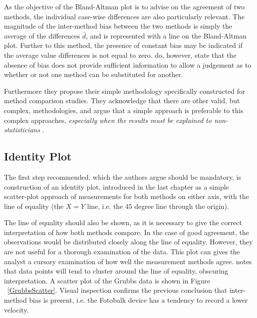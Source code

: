 \documentclass[12pt, a4paper]{report}
\theoremstyle{plain}
\theoremstyle{definition}
\theoremstyle{remark}
\begin{document}
	As the objective of the Bland-Altman plot is to advise on the agreement of two methods, the individual case-wise differences are also particularly relevant.	The magnitude of the inter-method bias between the two methods is simply the average of the differences $\bar{d}$, and is represented with a line on the Bland-Altman plot. Further to this method, the presence of constant bias may be
	indicated if the average value differences is not equal to zero. \citet{BA86} do, however, state that the absence of bias does not provide sufficient information to allow a judgement as to whether or not one method can be substituted for
	another.
	
Furthermore they propose their simple methodology specifically constructed for method comparison studies. They acknowledge that there are other valid, but complex, methodologies, and argue that
		a simple approach is preferable to this complex approaches,
		\emph{especially when the results must be explained to
			non-statisticians} \citep*{BA83}.
		
		\subsection{Identity Plot}
The first step recommended, which the authors argue should be mandatory, is construction of an identity plot, introduced in the last chapter as a simple scatter-plot approach of measurements for both methods on either axis, with the line of equality (the $X=Y$ line, i.e. the 45 degree line through the origin). 
			
The line of equality should also be shown, as it is necessary to give the correct interpretation of how both methods compare. In the case of good agreement, the observations would be distributed closely along the line of equality. However, they are not useful for a thorough examination of the data. This plot can gives the analyst a cursory examination of how well the measurement methods agree. \citet{BritHypSoc} notes that data points will tend to cluster around the line of equality, obscuring interpretation. A scatter plot of the Grubbs data is shown in Figure ~\ref{GrubbsScatter}. Visual inspection confirms the previous conclusion that inter-method bias is present, i.e. the Fotobalk device has a tendency to record a lower velocity.
	
\end{document}
